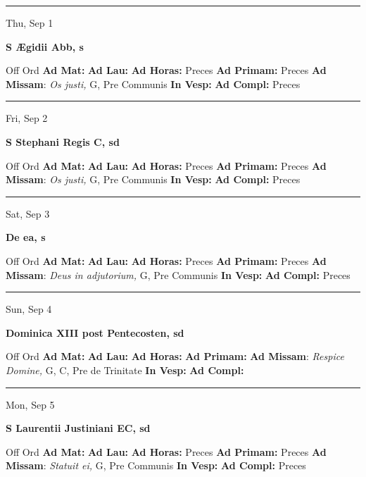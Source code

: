 \documentclass[letterpaper, 10pt]{article}
\begin{document}
\hrule
\begin{center}
Thu, Sep 1
\end{center}\textbf{ \large S Ægidii Abb, \textnormal{\normalsize s}}
\begin{justify}
Off Ord
\textbf{Ad Mat: }
\textbf{Ad Lau: }
\textbf{Ad Horas: }Preces
\textbf{Ad Primam: }Preces
\textbf{Ad Missam}: \textit{Os justi,} G, Pre Communis
\textbf{In Vesp: }
\textbf{Ad Compl: }Preces\end{justify}



\hrule
\begin{center}
Fri, Sep 2
\end{center}\textbf{ \large S Stephani Regis C, \textnormal{\normalsize sd}}
\begin{justify}
Off Ord
\textbf{Ad Mat: }
\textbf{Ad Lau: }
\textbf{Ad Horas: }Preces
\textbf{Ad Primam: }Preces
\textbf{Ad Missam}: \textit{Os justi,} G, Pre Communis
\textbf{In Vesp: }
\textbf{Ad Compl: }Preces\end{justify}



\hrule
\begin{center}
Sat, Sep 3
\end{center}\textbf{ \large De ea, \textnormal{\normalsize s}}
\begin{justify}
Off Ord
\textbf{Ad Mat: }
\textbf{Ad Lau: }
\textbf{Ad Horas: }Preces
\textbf{Ad Primam: }Preces
\textbf{Ad Missam}: \textit{Deus in adjutorium,} G, Pre Communis
\textbf{In Vesp: }
\textbf{Ad Compl: }Preces\end{justify}



\hrule
\begin{center}
Sun, Sep 4
\end{center}\textbf{ \large Dominica XIII post Pentecosten, \textnormal{\normalsize sd}}
\begin{justify}
Off Ord
\textbf{Ad Mat: }
\textbf{Ad Lau: }
\textbf{Ad Horas: }
\textbf{Ad Primam: }
\textbf{Ad Missam}: \textit{Respice Domine,} G, C, Pre de Trinitate
\textbf{In Vesp: }
\textbf{Ad Compl: }\end{justify}



\hrule
\begin{center}
Mon, Sep 5
\end{center}\textbf{ \large S Laurentii Justiniani EC, \textnormal{\normalsize sd}}
\begin{justify}
Off Ord
\textbf{Ad Mat: }
\textbf{Ad Lau: }
\textbf{Ad Horas: }Preces
\textbf{Ad Primam: }Preces
\textbf{Ad Missam}: \textit{Statuit ei,} G, Pre Communis
\textbf{In Vesp: }
\textbf{Ad Compl: }Preces\end{justify}
\end{document}
